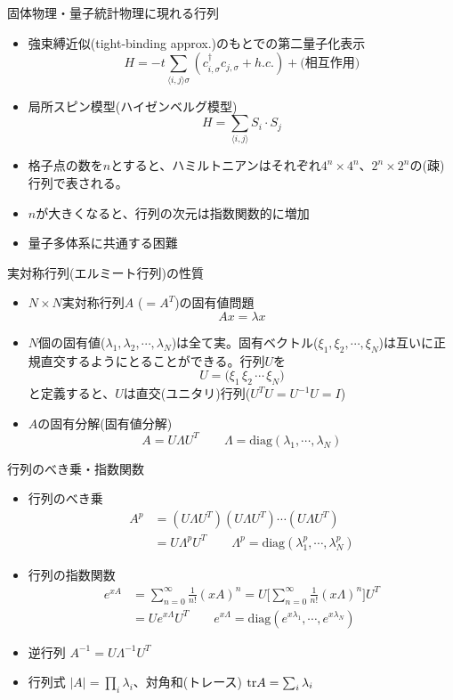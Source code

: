 \documentclass[dvipdfmx]{beamer}
\begin{document}
\begin{frame}[t,fragile]{固体物理・量子統計物理に現れる行列}
  \begin{itemize}
  \item 強束縛近似(tight-binding approx.)のもとでの第二量子化表示
    \[
    H = -t \sum_{\langle i,j \rangle \sigma} (c_{i,\sigma}^\dagger c_{j,\sigma} + h.c.) + \text{(相互作用)}
    \]
  \item 局所スピン模型(ハイゼンベルグ模型)
    \[
    H = \sum_{\langle i,j \rangle} S_i \cdot S_j
    \]
  \item 格子点の数を$n$とすると、ハミルトニアンはそれぞれ$4^n \times 4^n$、$2^n \times 2^n$の(疎)行列で表される。
  \item $n$が大きくなると、行列の次元は指数関数的に増加
  \item 量子多体系に共通する困難
  \end{itemize}
\end{frame}

\begin{frame}[t,fragile]{実対称行列(エルミート行列)の性質}
  \begin{itemize}
  \item $N \times N$実対称行列$A$ ($=A^T$)の固有値問題
    \[
    A x = \lambda x
    \]
  \item $N$個の固有値($\lambda_1,\lambda_2,\cdots,\lambda_N$)は全て実。固有ベクトル($\xi_1,\xi_2,\cdots,\xi_N$)は互いに正規直交するようにとることができる。行列$U$を
    \[
    U = \Big( \xi_1 \, \xi_2 \, \cdots \, \xi_N \Big)
    \]
    と定義すると、$U$は直交(ユニタリ)行列($U^T U = U^{-1} U = I$)
  \item $A$の固有分解(固有値分解)
    \[
    A = U \Lambda U^T \qquad \Lambda = \text{diag}(\lambda_1,\cdots,\lambda_N)
    \]
  \end{itemize}
\end{frame}

\begin{frame}[t,fragile]{行列のべき乗・指数関数}
  \begin{itemize}
  \item 行列のべき乗
    \begin{align*}
      A^p &= (U \Lambda U^T)(U \Lambda U^T) \cdots (U \Lambda U^T) \\
      &= U \Lambda^p U^T \qquad \Lambda^p = \text{diag}(\lambda_1^p,\cdots,\lambda_N^p)
    \end{align*}
  \item 行列の指数関数
    \begin{align*}
      e^{xA} &= \sum_{n=0}^{\infty} \frac{1}{n!}(xA)^n = U \Big[ \sum_{n=0}^{\infty} \frac{1}{n!}(x\Lambda)^n \Big] U^T \\
      &= U e^{x \Lambda} U^T \qquad e^{x \Lambda} = \text{diag}(e^{x\lambda_1},\cdots,e^{x\lambda_N})
    \end{align*}
  \item 逆行列 $A^{-1} = U \Lambda^{-1} U^T$
  \item 行列式 $|A| = \prod_i \lambda_i$、対角和(トレース) ${\rm tr} A = \sum_i \lambda_i$
  \end{itemize}
\end{frame}
\end{document}
